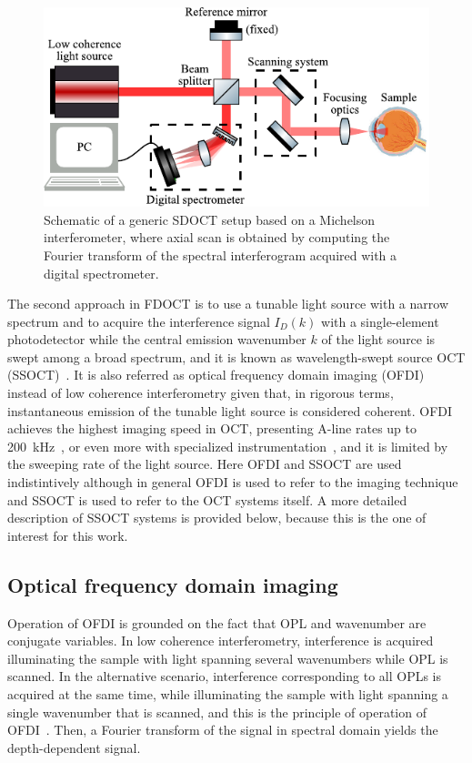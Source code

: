 \begin{figure}
    \centering
    \includegraphics[width=.75\textwidth]{Figures/TheoreticalBasis/SDOCT_Scheme.pdf}
    \caption[Schematic of a generic SDOCT setup based on a Michelson interferometer.]{Schematic of a generic SDOCT setup based on a Michelson interferometer, where axial scan is obtained by computing the Fourier transform of the spectral interferogram acquired with a digital spectrometer.}
    \label{fig:SDOCT_Scheme}
\end{figure}

The second approach in FDOCT is to use a tunable light source with a narrow spectrum and to acquire the interference signal $I_D(k)$ with a single-element photodetector while the central emission wavenumber $k$ of the light source is swept among a broad spectrum, and it is known as wavelength-swept source OCT (SSOCT)~\cite{Chinn1997_Optical, Yun2003_Highspeed}. It is also referred as optical frequency domain imaging (OFDI)~\cite{Bouma2015_Optical} instead of low coherence interferometry given that, in rigorous terms, instantaneous emission of the tunable light source is considered coherent. OFDI achieves the highest imaging speed in OCT, presenting A-line rates up to 200~kHz~\cite{Okabe2012_200}, or even more with specialized instrumentation~\cite{Oh2010_400}, and it is limited by the sweeping rate of the light source. Here OFDI and SSOCT are used indistintively although in general OFDI is used to refer to the imaging technique and SSOCT is used to refer to the OCT systems itself. A more detailed description of SSOCT systems is provided below, because this is the one of interest for this work.

\subsection{Optical frequency domain imaging}

Operation of OFDI is grounded on the fact that OPL and wavenumber are conjugate variables. In low coherence interferometry, interference is acquired illuminating the sample with light spanning several wavenumbers while OPL is scanned. In the alternative scenario, interference corresponding to all OPLs is acquired  at the same time, while illuminating the sample with light spanning a single wavenumber that is scanned, and this is the principle of operation of OFDI~\cite{Yun2003_Highspeed}. Then, a Fourier transform of the signal in spectral domain yields the depth-dependent signal.

